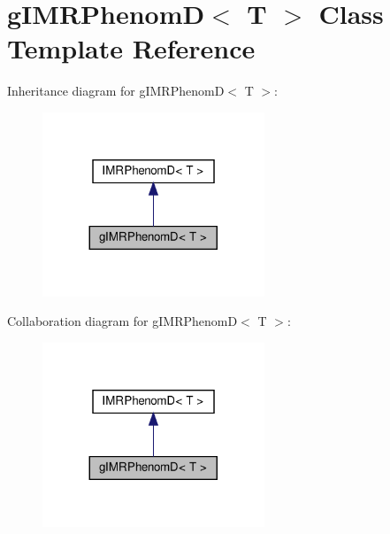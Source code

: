 \hypertarget{classgIMRPhenomD}{}\section{g\+I\+M\+R\+PhenomD$<$ T $>$ Class Template Reference}
\label{classgIMRPhenomD}


Inheritance diagram for g\+I\+M\+R\+PhenomD$<$ T $>$\+:\nopagebreak
\begin{figure}[H]
\begin{center}
\leavevmode
\includegraphics[width=188pt]{classgIMRPhenomD__inherit__graph}
\end{center}
\end{figure}


Collaboration diagram for g\+I\+M\+R\+PhenomD$<$ T $>$\+:\nopagebreak
\begin{figure}[H]
\begin{center}
\leavevmode
\includegraphics[width=188pt]{classgIMRPhenomD__coll__graph}
\end{center}
\end{figure}
